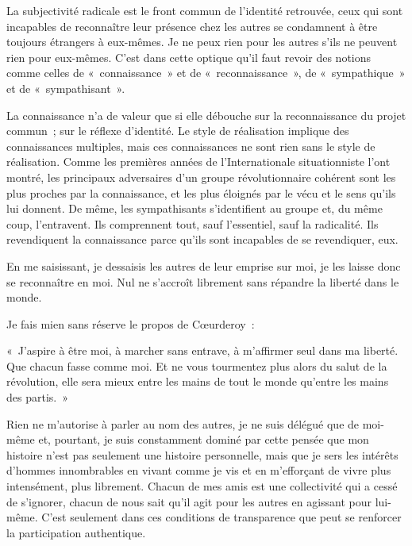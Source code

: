\documentclass[french,twoside]{book} %
\newenvironment{quoteblock}%
  {\begin{quoting}}
  {\end{quoting}}
\newenvironment{quotebar}{%
    \def\FrameCommand{{\color{rubric!10!}\vrule width 0.5em} \hspace{0.9em}}%
    \def\OuterFrameSep{\itemsep} %
    \MakeFramed {\advance\hsize-\width \FrameRestore}
  }%
  {%
    \endMakeFramed
  }
\renewenvironment{quoteblock}%
  {%
    \savenotes
    \setstretch{0.9}
    \normalfont
    \begin{quotebar}
  }
  {%
    \end{quotebar}
    \spewnotes
  }
\begin{document}
\noindent La subjectivité radicale est le front commun de l’identité retrouvée, ceux qui sont incapables de reconnaître leur présence chez les autres se condamnent à être toujours étrangers à eux-mêmes. Je ne peux rien pour les autres s’ils ne peuvent rien pour eux-mêmes. C’est dans cette optique qu’il faut revoir des notions comme celles de « connaissance » et de « reconnaissance », de « sympathique » et de « sympathisant ».\par
La connaissance n’a de valeur que si elle débouche sur la reconnaissance du projet commun ; sur le réflexe d’identité. Le style de réalisation implique des connaissances multiples, mais ces connaissances ne sont rien sans le style de réalisation. Comme les premières années de l’Internationale situationniste l’ont montré, les principaux adversaires d’un groupe révolutionnaire cohérent sont les plus proches par la connaissance, et les plus éloignés par le vécu et le sens qu’ils lui donnent. De même, les sympathisants s’identifient au groupe et, du même coup, l’entravent. Ils comprennent tout, sauf l’essentiel, sauf la radicalité. Ils revendiquent la connaissance parce qu’ils sont incapables de se revendiquer, eux.\par
En me saisissant, je dessaisis les autres de leur emprise sur moi, je les laisse donc se reconnaître en moi. Nul ne s’accroît librement sans répandre la liberté dans le monde.\par
Je fais mien sans réserve le propos de Cœurderoy :\par

\begin{quoteblock}
\noindent « J’aspire à être moi, à marcher sans entrave, à m’affirmer seul dans ma liberté. Que chacun fasse comme moi. Et ne vous tourmentez plus alors du salut de la révolution, elle sera mieux entre les mains de tout le monde qu’entre les mains des partis. »\end{quoteblock}

\noindent Rien ne m’autorise à parler au nom des autres, je ne suis délégué que de moi-même et, pourtant, je suis constamment dominé par cette pensée que mon histoire n’est pas seulement une histoire personnelle, mais que je sers les intérêts d’hommes innombrables en vivant comme je vis et en m’efforçant de vivre plus intensément, plus librement. Chacun de mes amis est une collectivité qui a cessé de s’ignorer, chacun de nous sait qu’il agit pour les autres en agissant pour lui-même. C’est seulement dans ces conditions de transparence que peut se renforcer la participation authentique.
\end{document}
